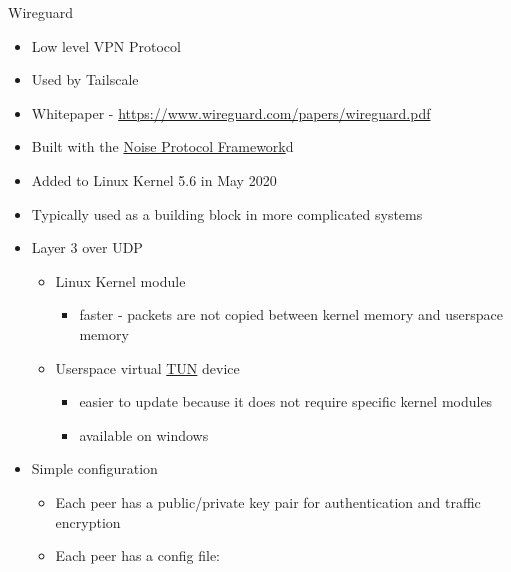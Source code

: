 \hypertarget{notes__02051-wireguard.md}{}
\begin{block}{Wireguard}
\protect\hypertarget{notes__02051-wireguard.md__wireguard}{}
\begin{itemize}
\tightlist
\item
  Low level VPN Protocol
\item
  Used by Tailscale
\item
  Whitepaper - \url{https://www.wireguard.com/papers/wireguard.pdf}
\item
  Built with the \protect\hyperlink{notes__02022-noise.md}{Noise
  Protocol Framework}d
\item
  Added to Linux Kernel 5.6 in May 2020
\item
  Typically used as a building block in more complicated systems
\item
  Layer 3 over UDP

  \begin{itemize}
  \tightlist
  \item
    Linux Kernel module

    \begin{itemize}
    \tightlist
    \item
      faster - packets are not copied between kernel memory and
      userspace memory
    \end{itemize}
  \item
    Userspace virtual \href{notes/02021-internet-protocol}{TUN} device

    \begin{itemize}
    \tightlist
    \item
      easier to update because it does not require specific kernel
      modules
    \item
      available on windows
    \end{itemize}
  \end{itemize}
\item
  Simple configuration

  \begin{itemize}
  \tightlist
  \item
    Each peer has a public/private key pair for authentication and
    traffic encryption
  \item
    Each peer has a config file:
  \end{itemize}
\end{itemize}

\newpage

\begin{Shaded}
\begin{Highlighting}[]
\KeywordTok{[Interface]}
\OtherTok{=}
\OtherTok{=}\StringTok{ }
\OtherTok{=}


\end{Highlighting}
\end{Shaded}
\end{block}
